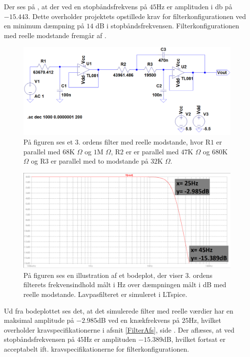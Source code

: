 Der ses på , at der ved en stopbåndsfrekvens på $45$Hz er amplituden i db på $-15.443$. Dette overholder projektets opstillede krav for filterkonfigurationen ved en minimum dæmpning på $14$ dB i stopbåndsfrekvensen. Filterkonfigurationen med reelle modstande fremgår af .
\begin{figure}[H]
	\centering
	\includegraphics[scale=0.4]{figures/cProblemloesning/Sim_reel_modstande.PNG}
	\caption{På figuren ses et 3. ordens filter med reelle modstande, hvor R$1$ er parallel med $68$K $\Omega$ og $1$M $\Omega$, R$2$ er er parallel med $47$K $\Omega$ og $680$K $\Omega$ og R$3$ er parallel med to modstande på $32$K $\Omega$.}
	\label{fig:Sim_reel_modstande}
\end{figure}

\begin{figure}[H]
	\centering
	\includegraphics[scale=0.35]{figures/cProblemloesning/Sim_reel_graf.PNG}
	\caption{På figuren ses en illustration af et bodeplot, der viser 3. ordens filterets frekvensindhold målt i Hz over dæmpningen målt i dB med reelle modstande. Lavpasfilteret er simuleret i LTspice.}
	\label{fig:Sim_reel_graf}
\end{figure}

\noindent Ud fra bodeplottet ses det, at det simulerede filter med reelle værdier har en maksimal amplitude på $-2.985$dB ved en knækfrekvens på $25$Hz, hvilket overholder kravspecifikationerne i afsnit \ref{FilterAfs}, side \pageref{FilterAfs}. Der aflæses, at ved stopbåndsfrekvensen på $45$Hz er amplituden $-15.389$dB, hvilket fortsat er acceptabelt ift. kravspecifikationerne for filterkonfigurationen. 

